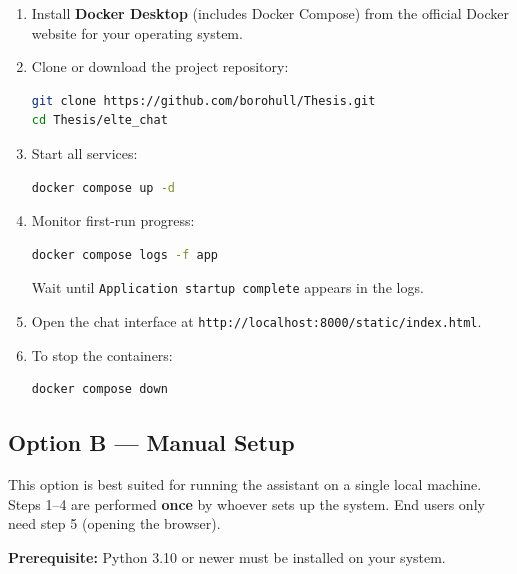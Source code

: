 \begin{enumerate}
    \item Install \textbf{Docker Desktop} (includes Docker Compose) from
          the official Docker website for your operating system.

    \item Clone or download the project repository:
\begin{lstlisting}[language=bash]
git clone https://github.com/borohull/Thesis.git
cd Thesis/elte_chat
\end{lstlisting}

    \item Start all services:
\begin{lstlisting}[language=bash]
docker compose up -d
\end{lstlisting}

    \item Monitor first-run progress:
\begin{lstlisting}[language=bash]
docker compose logs -f app
\end{lstlisting}
          Wait until \texttt{Application startup complete} appears in the logs.

    \item Open the chat interface at
          \texttt{http://localhost:8000/static/index.html}.

    \item To stop the containers:
\begin{lstlisting}[language=bash]
docker compose down
\end{lstlisting}
\end{enumerate}

\subsection*{Option B --- Manual Setup}

This option is best suited for running the assistant on a single local machine.
Steps 1--4 are performed \textbf{once} by whoever sets up the system.
End users only need step 5 (opening the browser).

\textbf{Prerequisite:} Python 3.10 or newer must be installed on your system.

